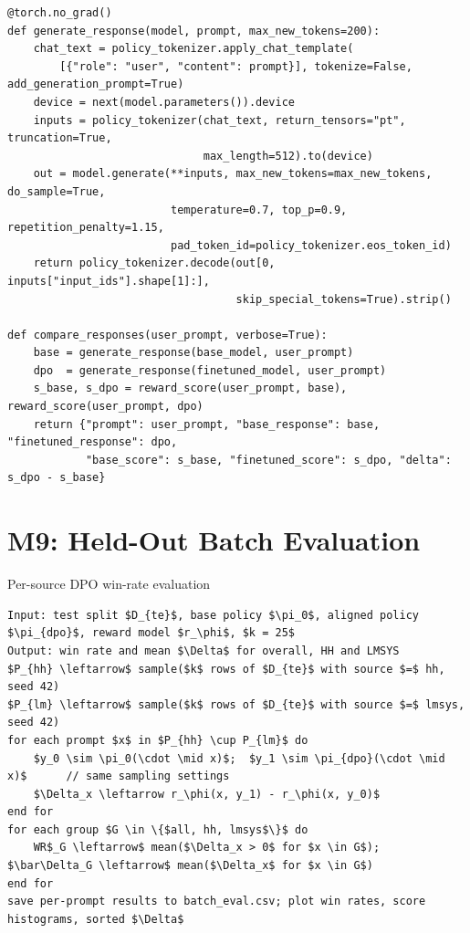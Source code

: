 \begin{lstlisting}[caption={Generating and comparing base and DPO responses.}, label={lst:compare}]
@torch.no_grad()
def generate_response(model, prompt, max_new_tokens=200):
    chat_text = policy_tokenizer.apply_chat_template(
        [{"role": "user", "content": prompt}], tokenize=False, add_generation_prompt=True)
    device = next(model.parameters()).device
    inputs = policy_tokenizer(chat_text, return_tensors="pt", truncation=True,
                              max_length=512).to(device)
    out = model.generate(**inputs, max_new_tokens=max_new_tokens, do_sample=True,
                         temperature=0.7, top_p=0.9, repetition_penalty=1.15,
                         pad_token_id=policy_tokenizer.eos_token_id)
    return policy_tokenizer.decode(out[0, inputs["input_ids"].shape[1]:],
                                   skip_special_tokens=True).strip()

def compare_responses(user_prompt, verbose=True):
    base = generate_response(base_model, user_prompt)
    dpo  = generate_response(finetuned_model, user_prompt)
    s_base, s_dpo = reward_score(user_prompt, base), reward_score(user_prompt, dpo)
    return {"prompt": user_prompt, "base_response": base, "finetuned_response": dpo,
            "base_score": s_base, "finetuned_score": s_dpo, "delta": s_dpo - s_base}
\end{lstlisting}

\section{M9: Held-Out Batch Evaluation}
\label{sec:m9}

\begin{algobox}{Per-source DPO win-rate evaluation}\label{alg:dpoeval}
\begin{lstlisting}[style=algo]
Input: test split $D_{te}$, base policy $\pi_0$, aligned policy $\pi_{dpo}$, reward model $r_\phi$, $k = 25$
Output: win rate and mean $\Delta$ for overall, HH and LMSYS
$P_{hh} \leftarrow$ sample($k$ rows of $D_{te}$ with source $=$ hh, seed 42)
$P_{lm} \leftarrow$ sample($k$ rows of $D_{te}$ with source $=$ lmsys, seed 42)
for each prompt $x$ in $P_{hh} \cup P_{lm}$ do
    $y_0 \sim \pi_0(\cdot \mid x)$;  $y_1 \sim \pi_{dpo}(\cdot \mid x)$      // same sampling settings
    $\Delta_x \leftarrow r_\phi(x, y_1) - r_\phi(x, y_0)$
end for
for each group $G \in \{$all, hh, lmsys$\}$ do
    WR$_G \leftarrow$ mean($\Delta_x > 0$ for $x \in G$);   $\bar\Delta_G \leftarrow$ mean($\Delta_x$ for $x \in G$)
end for
save per-prompt results to batch_eval.csv; plot win rates, score histograms, sorted $\Delta$
\end{lstlisting}
\end{algobox}

